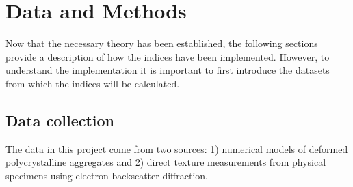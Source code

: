 \documentclass[a4paper,12pt,twoside]{report}
\numberwithin{equation}{chapter}
\begin{document}
\chapter{Data and Methods} \label{chap:methods}
\vspace{-1cm}

Now that the necessary theory has been established, the following sections provide a description of how the indices have been implemented. However, to understand the implementation it is important to first introduce the datasets from which the indices will be calculated.  

\section{Data collection} \label{sec:data}
The data in this project come from two sources: 1) numerical models of deformed polycrystalline aggregates and 2) direct texture measurements from physical specimens using electron backscatter diffraction. 
\end{document}
